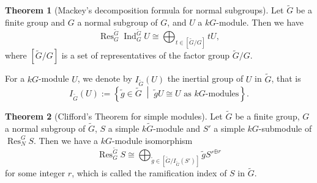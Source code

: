 \documentclass[pdftex,a4paper]{article}
\numberwithin{equation}{subsection}
\theoremstyle{definition}
\newtheorem{theorem}{Theorem}[section]
\newcommand{\setmid}{\; \middle|\;}
\newcommand{\induc}{{\operatorname{Ind}\nolimits}}
\newcommand{\restr}{{\operatorname{Res}\nolimits}}
\newcommand{\decompgp}{I}
\begin{document}
\begin{theorem}[Mackey's decomposition formula for normal subgroups]\label{Mackey's decomposition formula}
	Let \(\tilde{G}\) be a finite group and \(G\) a normal subgroup of \(G\), and \(U\) a \(kG\)-module. Then we have
	\begin{equation}
		\restr^{\tilde{G}}_G\induc^{\tilde{G}}_G U\cong\bigoplus_{t \in [\tilde{G}/G]} tU,
	\end{equation}
	where \([\tilde{G}/G]\) is a set of representatives of the factor group \(\tilde{G}/G\).
\end{theorem}
For a  \(kG\)-module \(U\), we denote by \(\decompgp_{\tilde{G}}(U)\) the inertial group of \(U\) in \(\tilde{G}\), that is
\begin{equation}
	\decompgp_{\tilde{G}}(U):=\left\{ \tilde{g} \in \tilde{G} \setmid \tilde{g}U \cong U \text{ as \(kG\)-modules} \right\}.
\end{equation}

\begin{theorem}[Clifford's Theorem for simple modules]\label{Clifford's Theorem of simple module}
	Let \(\tilde{G}\) be a finite group, \(G\) a normal subgroup of \(\tilde{G}\), \(S\) a simple \(k\tilde{G}\)-module and \(S'\) a simple \(kG\)-submodule of \(\restr_N^G S\). Then we have a \(kG\)-module isomorphism
	\begin{equation}
		\restr_G^{\tilde{G}} S \cong \bigoplus_{\tilde{g} \in [\tilde{G}/\decompgp_{\tilde{G}}(S')]} \tilde{g}S'^{\oplus r}
	\end{equation}
	for some integer \(r\), which is called the ramification index of \(S\) in \(\tilde{G}\).
\end{theorem}
\end{document}
